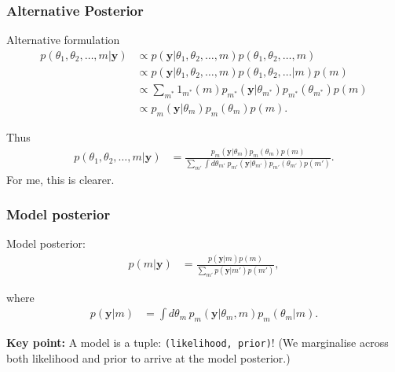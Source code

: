 \documentclass[usenames,dvipsnames,table]{beamer}
\begin{document}
\begin{frame}
\frametitle{Alternative Posterior}

Alternative formulation
\begin{align*}
p(\theta_1, \theta_2, \ldots, m|\mathbf{y})
    &\propto p(\mathbf{y}|\theta_1, \theta_2, \ldots, m)
             p(\theta_1, \theta_2, \ldots, m)
\\
    &\propto p(\mathbf{y}|\theta_1, \theta_2, \ldots, m)
             p(\theta_1, \theta_2, \ldots| m)
             p(m)
\\
    &\propto \sum_{m^*} 1_{m^*}(m) p_{m^*}(\mathbf{y}|\theta_{m^*})
                                   p_{m^*}(\theta_{m^*})p(m)
\\
    &\propto p_{m}(\mathbf{y}|\theta_{m}) p_{m}(\theta_{m})p(m).
\end{align*}

Thus
\begin{align*}
p(\theta_1, \theta_2, \ldots, m|\mathbf{y})
    &= \frac{p_{m}(\mathbf{y}|\theta_{m}) p_{m}(\theta_{m})p(m)}
            {\sum_{m'} \int\! d\theta_{m'}\
             p_{m'}(\mathbf{y}|\theta_{m'}) p_{m'}(\theta_{m'})p(m')}\tag{10.2*}.
\end{align*}
For me, this is clearer.
\end{frame}



\begin{frame}
\frametitle{Model posterior}

Model posterior:
\begin{align*}
p(m|\mathbf{y})
    &= \frac{p(\mathbf{y}|m)p(m)}
            {\sum_{m'} p(\mathbf{y}|m')p(m')}, \tag{10.3}
\end{align*}

where
\begin{align*}
p(\mathbf{y}|m)
    &= \int\! d\theta_{m}\,
             p_{m}(\mathbf{y}|\theta_{m},m) p_{m}(\theta_{m}|m). \tag{10.4}
\end{align*}

\textbf{Key point:} A model is a tuple: \texttt{(likelihood, prior)}! (We marginalise across both likelihood and prior to arrive at the model posterior.)
\end{frame}
\end{document}
